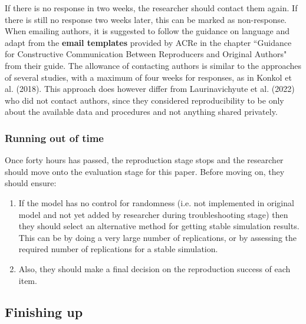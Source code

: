 If there is no response in two weeks, the researcher should contact them again. If there is still no response two weeks later, this can be marked as non-response. When emailing authors, it is suggested to follow the guidance on language and adapt from the \textbf{email templates} provided by ACRe in the chapter ``Guidance for Constructive Communication Between Reproducers and Original Authors" from their guide.\autocite{berkeley_initiative_for_transparency_in_the_social_sciences_guide_2022} The allowance of contacting authors is similar to the approaches of several studies,\autocite{krafczyk_learning_2021,wood_push_2018,berkeley_initiative_for_transparency_in_the_social_sciences_guide_2022,hardwicke_analytic_2021,konkol_computational_2019} with a maximum of four weeks for responses, as in Konkol et al. (2018)\autocite{konkol_computational_2019}. This approach does however differ from Laurinavichyute et al. (2022)\autocite{laurinavichyute_share_2022} who did not contact authors, since they considered reproducibility to be only about the available data and procedures and not anything shared privately.\autocite{laurinavichyute_share_2022}

\vspace{0.5cm}
\subsubsection{Running out of time}

Once forty hours has passed, the reproduction stage stops and the researcher should move onto the evaluation stage for this paper. Before moving on, they should ensure:
\begin{enumerate}
    \item If the model has no control for randomness (i.e. not implemented in original model and not yet added by researcher during troubleshooting stage) then they should select an alternative method for getting stable simulation results. This can be by doing a very large number of replications, or by assessing the required number of replications for a stable simulation.
    \item Also, they should make a final decision on the reproduction success of each item.
\end{enumerate}

\vspace{0.5cm}
\subsection{Finishing up}

